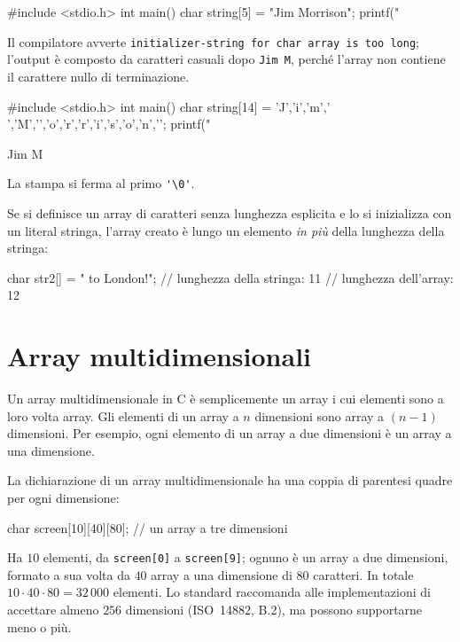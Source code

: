 \documentclass[11pt,a4paper]{article}
\begin{document}
\begin{esempio}
\begin{codice}
#include <stdio.h>
int main() {
    char string[5] = "Jim Morrison";
    printf("%
}
\end{codice}
Il compilatore avverte \texttt{initializer-string for char array is too long}; l'output è composto da caratteri casuali dopo \texttt{Jim M}, perché l'array non contiene il carattere nullo di terminazione.
\end{esempio}

\begin{esempio}
\begin{codice}
#include <stdio.h>
int main() {
    char string[14] = {'J','i','m',' ','M','\0','o','r','r','i','s','o','n','\0'};
    printf("%
}
\end{codice}
\begin{risultato}
Jim M
\end{risultato}
La stampa si ferma al primo \lstinline|'\0'|.
\end{esempio}

Se si definisce un array di caratteri senza lunghezza esplicita e lo si inizializza con un literal stringa, l'array creato è lungo un elemento \emph{in più} della lunghezza della stringa:
\begin{codice}
char str2[] = " to London!";   // lunghezza della stringa: 11
                               // lunghezza dell'array: 12
\end{codice}

\section{Array multidimensionali}

Un array multidimensionale in C è semplicemente un array i cui elementi sono a loro volta array. Gli elementi di un array a $n$ dimensioni sono array a $(n-1)$ dimensioni. Per esempio, ogni elemento di un array a due dimensioni è un array a una dimensione.

La dichiarazione di un array multidimensionale ha una coppia di parentesi quadre per ogni dimensione:
\begin{codice}
char screen[10][40][80];   // un array a tre dimensioni
\end{codice}
Ha $10$ elementi, da \lstinline|screen[0]| a \lstinline|screen[9]|; ognuno è un array a due dimensioni, formato a sua volta da $40$ array a una dimensione di $80$ caratteri. In totale $10\cdot 40 \cdot 80 = 32\,000$ elementi. Lo standard raccomanda alle implementazioni di accettare almeno $256$ dimensioni (ISO~14882, B.2), ma possono supportarne meno o più.
\end{document}
